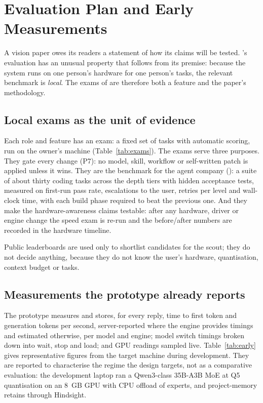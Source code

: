 \section{Evaluation Plan and Early Measurements}
\label{sec:evaluation}

A vision paper owes its readers a statement of how its claims will be tested. \hivi{}'s evaluation has an unusual property that follows from its premise: because the system runs on one person's hardware for one person's tasks, the relevant benchmark is \emph{local}. The exams of  are therefore both a feature and the paper's methodology.

\subsection{Local exams as the unit of evidence}

Each role and feature has an exam: a fixed set of tasks with automatic scoring, run on the owner's machine (Table~\ref{tab:exams}). The exams serve three purposes. They gate every change (P7): no model, skill, workflow or self-written patch is applied unless it wins. They are the benchmark for the agent company (): a suite of about thirty coding tasks across the depth tiers with hidden acceptance tests, measured on first-run pass rate, escalations to the user, retries per level and wall-clock time, with each build phase required to beat the previous one. And they make the hardware-awareness claims testable: after any hardware, driver or engine change the speed exam is re-run and the before/after numbers are recorded in the hardware timeline.

Public leaderboards are used only to shortlist candidates for the scout; they do not decide anything, because they do not know the user's hardware, quantisation, context budget or tasks.

\subsection{Measurements the prototype already reports}

The prototype measures and stores, for every reply, time to first token and generation tokens per second, server-reported where the engine provides timings and estimated otherwise, per model and engine; model switch timings broken down into wait, stop and load; and GPU readings sampled live. Table~\ref{tab:early} gives representative figures from the target machine during development. They are reported to characterise the regime the design targets, not as a comparative evaluation: the development laptop ran a Qwen3-class 35B-A3B MoE at Q5 quantisation on an 8~GB GPU with CPU offload of experts, and project-memory retains through Hindsight.

